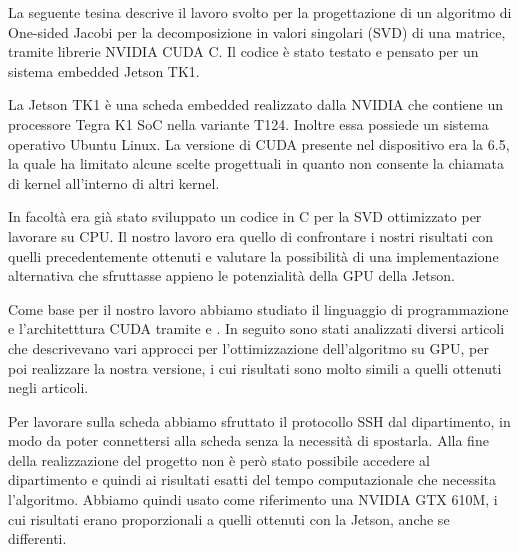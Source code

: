 La seguente tesina descrive il lavoro svolto per la progettazione di un algoritmo di One-sided Jacobi per la decomposizione in valori singolari (SVD) di una matrice, tramite librerie NVIDIA CUDA C. Il codice è stato testato e pensato per un sistema embedded Jetson TK1.

La Jetson TK1 è una scheda embedded realizzato dalla NVIDIA che contiene un processore Tegra K1 SoC nella variante T124. Inoltre essa possiede un sistema operativo Ubuntu Linux. La versione di CUDA presente nel dispositivo era la 6.5, la quale ha limitato alcune scelte progettuali in quanto non consente la chiamata di kernel all'interno di altri kernel.

In facoltà era già stato sviluppato un codice in C per la SVD ottimizzato per lavorare su CPU. Il nostro lavoro era quello di confrontare i nostri risultati con quelli precedentemente ottenuti e valutare la possibilità di una implementazione alternativa che sfruttasse appieno le potenzialità della GPU della Jetson.

Come base per il nostro lavoro abbiamo studiato il linguaggio di programmazione e l'architetttura CUDA tramite \cite{Cheng:ProfessionalCudaProgramming} e \cite{Sanders:CudaByExample}. In seguito sono stati analizzati diversi articoli che descrivevano vari approcci per l'ottimizzazione dell'algoritmo su GPU, per poi realizzare la nostra versione, i cui risultati sono molto simili a quelli ottenuti negli articoli.

Per lavorare sulla scheda abbiamo sfruttato il protocollo SSH dal dipartimento, in modo da poter connettersi alla scheda senza la necessità di spostarla. Alla fine della realizzazione del progetto non è però stato possibile accedere al dipartimento e quindi ai risultati esatti del tempo computazionale che necessita l'algoritmo. Abbiamo quindi usato come riferimento una NVIDIA GTX 610M, i cui risultati erano proporzionali a quelli ottenuti con la Jetson, anche se differenti.